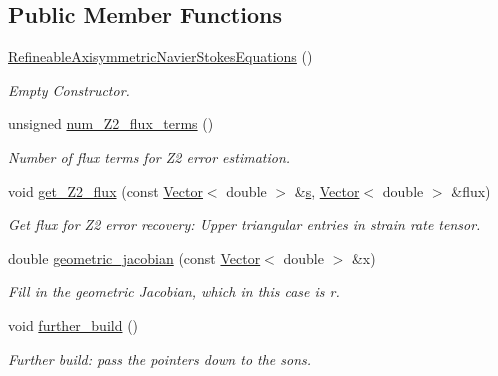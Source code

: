 \subsection*{Public Member Functions}
\begin{DoxyCompactItemize}
\item 
\hyperlink{classoomph_1_1RefineableAxisymmetricNavierStokesEquations_a65ab079fd600413cfa0a72c0107b4ac3}{Refineable\+Axisymmetric\+Navier\+Stokes\+Equations} ()
\begin{DoxyCompactList}\small\item\em Empty Constructor. \end{DoxyCompactList}\item 
unsigned \hyperlink{classoomph_1_1RefineableAxisymmetricNavierStokesEquations_a685e10bb8a044e2fd274401a7e70dc33}{num\+\_\+\+Z2\+\_\+flux\+\_\+terms} ()
\begin{DoxyCompactList}\small\item\em Number of \textquotesingle{}flux\textquotesingle{} terms for Z2 error estimation. \end{DoxyCompactList}\item 
void \hyperlink{classoomph_1_1RefineableAxisymmetricNavierStokesEquations_ad4db711b6d0357a3b008624d68b3b1ba}{get\+\_\+\+Z2\+\_\+flux} (const \hyperlink{classoomph_1_1Vector}{Vector}$<$ double $>$ \&\hyperlink{cfortran_8h_ab7123126e4885ef647dd9c6e3807a21c}{s}, \hyperlink{classoomph_1_1Vector}{Vector}$<$ double $>$ \&flux)
\begin{DoxyCompactList}\small\item\em Get \textquotesingle{}flux\textquotesingle{} for Z2 error recovery\+: Upper triangular entries in strain rate tensor. \end{DoxyCompactList}\item 
double \hyperlink{classoomph_1_1RefineableAxisymmetricNavierStokesEquations_a2821817758a676f37d3bfe4629620b71}{geometric\+\_\+jacobian} (const \hyperlink{classoomph_1_1Vector}{Vector}$<$ double $>$ \&x)
\begin{DoxyCompactList}\small\item\em Fill in the geometric Jacobian, which in this case is r. \end{DoxyCompactList}\item 
void \hyperlink{classoomph_1_1RefineableAxisymmetricNavierStokesEquations_a9e0d4b625595604ff1297b4c86a011bd}{further\+\_\+build} ()
\begin{DoxyCompactList}\small\item\em Further build\+: pass the pointers down to the sons. \end{DoxyCompactList}\item 

\end{DoxyCompactItemize}
